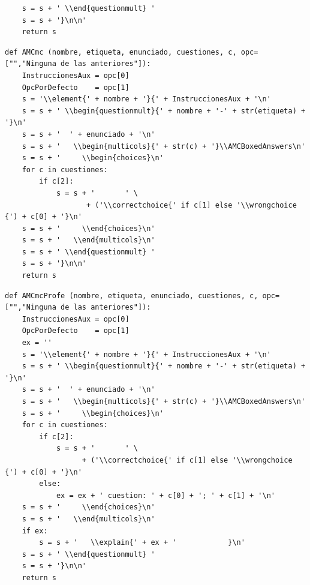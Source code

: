 \documentclass[10pt,a4paper]{report}
\begin{document}
\begin{enumerate}
\begin{verbatim}
    s = s + ' \\end{questionmult} '
    s = s + '}\n\n'
    return s
\end{verbatim}

\begin{verbatim}
def AMCmc (nombre, etiqueta, enunciado, cuestiones, c, opc=["","Ninguna de las anteriores"]):    
    InstruccionesAux = opc[0]
    OpcPorDefecto    = opc[1]
    s = '\\element{' + nombre + '}{' + InstruccionesAux + '\n'
    s = s + ' \\begin{questionmult}{' + nombre + '-' + str(etiqueta) + '}\n'
    s = s + '  ' + enunciado + '\n'
    s = s + '   \\begin{multicols}{' + str(c) + '}\\AMCBoxedAnswers\n'
    s = s + '     \\begin{choices}\n'    
    for c in cuestiones:
        if c[2]: 
            s = s + '       ' \
                   + ('\\correctchoice{' if c[1] else '\\wrongchoice  {') + c[0] + '}\n'
    s = s + '     \\end{choices}\n'
    s = s + '   \\end{multicols}\n'
    s = s + ' \\end{questionmult} '
    s = s + '}\n\n'
    return s
\end{verbatim}

\begin{verbatim}
def AMCmcProfe (nombre, etiqueta, enunciado, cuestiones, c, opc=["","Ninguna de las anteriores"]):
    InstruccionesAux = opc[0]
    OpcPorDefecto    = opc[1]
    ex = '' 
    s = '\\element{' + nombre + '}{' + InstruccionesAux + '\n'
    s = s + ' \\begin{questionmult}{' + nombre + '-' + str(etiqueta) + '}\n'
    s = s + '  ' + enunciado + '\n'
    s = s + '   \\begin{multicols}{' + str(c) + '}\\AMCBoxedAnswers\n'
    s = s + '     \\begin{choices}\n'    
    for c in cuestiones:
        if c[2]: 
            s = s + '       ' \
                  + ('\\correctchoice{' if c[1] else '\\wrongchoice  {') + c[0] + '}\n'
        else:
            ex = ex + ' cuestion: ' + c[0] + '; ' + c[1] + '\n'
    s = s + '     \\end{choices}\n'
    s = s + '   \\end{multicols}\n'
    if ex:
        s = s + '   \\explain{' + ex + '            }\n'     
    s = s + ' \\end{questionmult} '
    s = s + '}\n\n'
    return s
\end{verbatim}


\end{enumerate}
\end{document}
